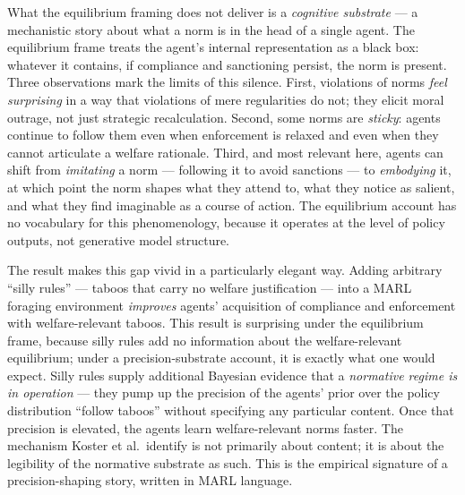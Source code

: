 What the equilibrium framing does not deliver is a \textit{cognitive substrate}
--- a mechanistic story about what a norm is in the head of a single agent.
The equilibrium frame treats the agent's internal representation as a black box:
whatever it contains, if compliance and sanctioning persist, the norm is present.
Three observations mark the limits of this silence. First, violations of norms
\textit{feel surprising} in a way that violations of mere regularities do not;
they elicit moral outrage, not just strategic recalculation. Second, some norms
are \textit{sticky}: agents continue to follow them even when enforcement is
relaxed and even when they cannot articulate a welfare rationale. Third, and
most relevant here, agents can shift from \textit{imitating} a norm --- following
it to avoid sanctions --- to \textit{embodying} it, at which point the norm shapes
what they attend to, what they notice as salient, and what they find imaginable
as a course of action. The equilibrium account has no vocabulary for this
phenomenology, because it operates at the level of policy outputs, not generative
model structure.

The \citet{koster2022SillyRules} result makes this gap vivid in a particularly
elegant way. Adding arbitrary ``silly rules'' --- taboos that carry no welfare
justification --- into a MARL foraging environment \textit{improves} agents'
acquisition of compliance and enforcement with welfare-relevant taboos. This
result is surprising under the equilibrium frame, because silly rules add no
information about the welfare-relevant equilibrium; under a precision-substrate
account, it is exactly what one would expect. Silly rules supply additional
Bayesian evidence that a \textit{normative regime is in operation} ---
they pump up the precision of the agents' prior over the policy distribution
``follow taboos'' without specifying any particular content. Once that
precision is elevated, the agents learn welfare-relevant norms faster. The
mechanism Koster et al.\ identify is not primarily about content; it is about
the legibility of the normative substrate as such. This is the empirical
signature of a precision-shaping story, written in MARL language.

